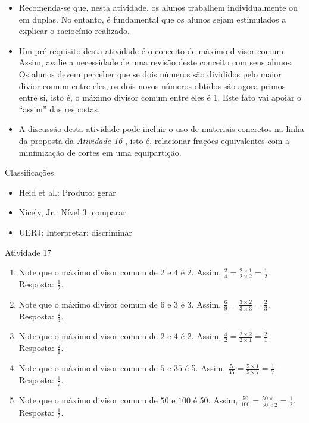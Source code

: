 \documentclass[oneside]{book}
\begin{document}
\begin{multicols}{2}
 
\begin{itemize} %
    \item       Recomenda-se que, nesta atividade, os alunos trabalhem 
individualmente ou em duplas. No entanto, é fundamental que os alunos sejam 
estimulados a explicar o raciocínio realizado.
    \item       Um pré-requisito desta atividade é o conceito de máximo divisor 
comum. Assim, avalie a necessidade de uma revisão deste conceito com seus 
alunos. Os alunos devem perceber que se dois números são divididos pelo maior 
divior comum entre eles, os dois novos números obtidos são agora primos entre 
si, isto é, o máximo divisor comum entre eles é 1. Este fato vai apoiar o       
``assim''       das respostas. 
    \item       A discussão desta atividade pode incluir o uso de materiais 
concretos na linha da proposta da \emph{Atividade 16}      , isto é, relacionar  
frações equivalentes com a minimização de cortes em uma equipartição.
\end{itemize} %
  
  Classificações  
\begin{itemize} %
    \item       Heid et al.: Produto: gerar
    \item       Nicely, Jr.: Nível 3: comparar
    \item       UERJ: Interpretar: discriminar
\end{itemize} %

\begin{resposta*}{Atividade 17}
\begin{enumerate}
 \item Note que o máximo divisor comum de   $2$   e   $4$   é 2. Assim,   
$\frac{2}{4} = \frac{2 \times 1}{2 \times 2} = \frac{1}{2}$. Resposta:   
$\frac{1}{2}$.  
 \item Note que o máximo divisor comum de   $6$   e   $3$   é 3. Assim,   
$\frac{6}{9} = \frac{3 \times 2}{3 \times 3} = \frac{2}{3}$. Resposta:   
$\frac{2}{3}$.  
 \item Note que o máximo divisor comum de   $2$   e   $4$   é 2. Assim,   
$\frac{4}{2} = \frac{2 \times 2}{2 \times 1} = \frac{2}{1}$. Resposta:   
$\frac{2}{1}$.  
 \item Note que o máximo divisor comum de   $5$   e   $35$   é 5. Assim,   
$\frac{5}{35} = \frac{5 \times 1}{5 \times 7} = \frac{1}{7}$. Resposta:   
$\frac{1}{7}$.  
 \item Note que o máximo divisor comum de   $50$   e   $100$   é 50. Assim,   
$\frac{50}{100} = \frac{50 \times 1}{50 \times 2} = \frac{1}{2}$. Resposta:   
$\frac{1}{2}$.  
\end{enumerate}


\end{resposta*}
\end{multicols}
\end{document}
